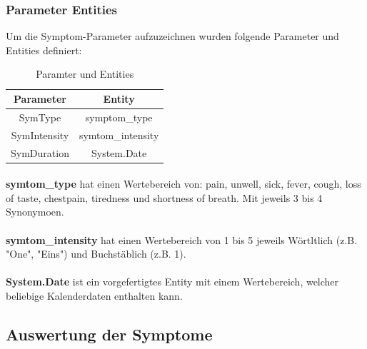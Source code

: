 \documentclass[11pt, letterpaper]{article}
\begin{document}
        \subsubsection{Parameter Entities}
            Um die Symptom-Parameter aufzuzeichnen wurden folgende Parameter und Entities definiert:
            \begin{table}[!h]
                \begin{center}
                    \begin{tabular}{c|c}
                        \textbf{Parameter} & \textbf{Entity}\\
                        \hline
                        SymType & symptom\_type\\
                        SymIntensity & symtom\_intensity\\
                        SymDuration & System.Date
                    \end{tabular}
                    \caption{Paramter und Entities}
                    \label{tab:tabelleParamsUndEntities}
                \end{center}
            \end{table}
            
            \paragraph{}
                \textbf{symtom\_type} hat einen Wertebereich von: pain, unwell,
                sick, fever, cough, loss of taste, chestpain, tiredness und shortness of breath. Mit jeweils 3 bis 4 
                Synonymoen.
            
            \paragraph{}
                \textbf{symtom\_intensity} hat einen Wertebereich von 1 bis 5 jeweils Wörtltlich (z.B. "One", "Eins") und
                Buchstäblich (z.B. 1).
            
            \paragraph{}
                \textbf{System.Date} ist ein vorgefertigtes Entity mit einem Wertebereich, welcher beliebige Kalenderdaten
                enthalten kann.
    \subsection{Auswertung der Symptome}
\end{document}
